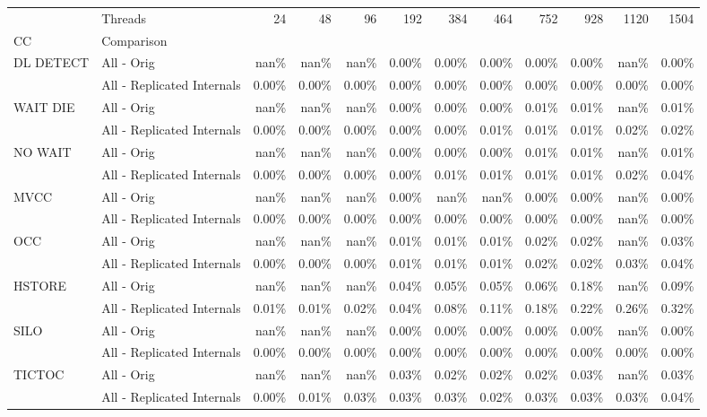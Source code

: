 \begin{tabular}{llrrrrrrrrrr}
\toprule
       & Threads &  24   &  48   &  96   &  192  &  384  &  464  &  752  &  928  &  1120 &  1504 \\
CC & Comparison &       &       &       &       &       &       &       &       &       &       \\
\midrule
DL DETECT & All - Orig &  nan\% &  nan\% &  nan\% & 0.00\% & 0.00\% & 0.00\% & 0.00\% & 0.00\% &  nan\% & 0.00\% \\
       & All - Replicated Internals & 0.00\% & 0.00\% & 0.00\% & 0.00\% & 0.00\% & 0.00\% & 0.00\% & 0.00\% & 0.00\% & 0.00\% \\
WAIT DIE & All - Orig &  nan\% &  nan\% &  nan\% & 0.00\% & 0.00\% & 0.00\% & 0.01\% & 0.01\% &  nan\% & 0.01\% \\
       & All - Replicated Internals & 0.00\% & 0.00\% & 0.00\% & 0.00\% & 0.00\% & 0.01\% & 0.01\% & 0.01\% & 0.02\% & 0.02\% \\
NO WAIT & All - Orig &  nan\% &  nan\% &  nan\% & 0.00\% & 0.00\% & 0.00\% & 0.01\% & 0.01\% &  nan\% & 0.01\% \\
       & All - Replicated Internals & 0.00\% & 0.00\% & 0.00\% & 0.00\% & 0.01\% & 0.01\% & 0.01\% & 0.01\% & 0.02\% & 0.04\% \\
MVCC & All - Orig &  nan\% &  nan\% &  nan\% & 0.00\% &  nan\% &  nan\% & 0.00\% & 0.00\% &  nan\% & 0.00\% \\
       & All - Replicated Internals & 0.00\% & 0.00\% & 0.00\% & 0.00\% & 0.00\% & 0.00\% & 0.00\% & 0.00\% &  nan\% & 0.00\% \\
OCC & All - Orig &  nan\% &  nan\% &  nan\% & 0.01\% & 0.01\% & 0.01\% & 0.02\% & 0.02\% &  nan\% & 0.03\% \\
       & All - Replicated Internals & 0.00\% & 0.00\% & 0.00\% & 0.01\% & 0.01\% & 0.01\% & 0.02\% & 0.02\% & 0.03\% & 0.04\% \\
HSTORE & All - Orig &  nan\% &  nan\% &  nan\% & 0.04\% & 0.05\% & 0.05\% & 0.06\% & 0.18\% &  nan\% & 0.09\% \\
       & All - Replicated Internals & 0.01\% & 0.01\% & 0.02\% & 0.04\% & 0.08\% & 0.11\% & 0.18\% & 0.22\% & 0.26\% & 0.32\% \\
SILO & All - Orig &  nan\% &  nan\% &  nan\% & 0.00\% & 0.00\% & 0.00\% & 0.00\% & 0.00\% &  nan\% & 0.00\% \\
       & All - Replicated Internals & 0.00\% & 0.00\% & 0.00\% & 0.00\% & 0.00\% & 0.00\% & 0.00\% & 0.00\% & 0.00\% & 0.00\% \\
TICTOC & All - Orig &  nan\% &  nan\% &  nan\% & 0.03\% & 0.02\% & 0.02\% & 0.02\% & 0.03\% &  nan\% & 0.03\% \\
       & All - Replicated Internals & 0.00\% & 0.01\% & 0.03\% & 0.03\% & 0.03\% & 0.02\% & 0.03\% & 0.03\% & 0.03\% & 0.04\% \\
\bottomrule
\end{tabular}
